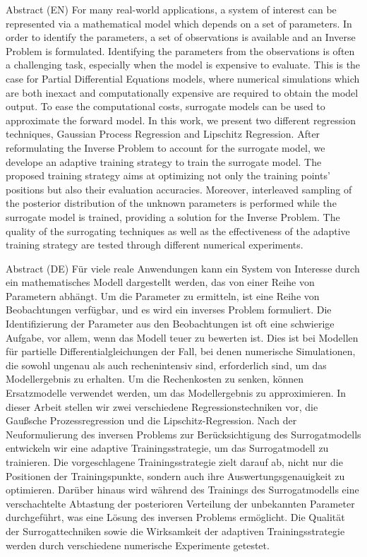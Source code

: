 \begin{abstractBox}[colbacktitle=black]{Abstract (EN)}{
    For many real-world applications, a system of interest can be represented via a mathematical model which depends on a set of parameters. 
    In order to identify the parameters, a set of observations is available and an Inverse Problem is formulated. 
    Identifying the parameters from the observations is often a challenging task, especially when the model is expensive to evaluate. 
    This is the case for Partial Differential Equations models, where numerical simulations which are both inexact and computationally expensive are required to obtain the model output. 
    To ease the computational costs, surrogate models can be used to approximate the forward model. 
    In this work, we present two different regression techniques, Gaussian Process Regression and Lipschitz Regression. 
    After reformulating the Inverse Problem to account for the surrogate model, we develope an adaptive training strategy to train the surrogate model. 
    The proposed training strategy aims at optimizing not only the training points' positions but also their evaluation accuracies.
    Moreover, interleaved sampling of the posterior distribution of the unknown parameters is performed while the surrogate model is trained, providing a solution for the Inverse Problem.
    The quality of the surrogating techniques as well as the effectiveness of the adaptive training strategy are tested through different numerical experiments.
}
\end{abstractBox}
\begin{abstractBox}[colbacktitle=black]{Abstract (DE)}{
    Für viele reale Anwendungen kann ein System von Interesse durch ein mathematisches Modell dargestellt werden, das von einer Reihe von Parametern abhängt. 
    Um die Parameter zu ermitteln, ist eine Reihe von Beobachtungen verfügbar, und es wird ein inverses Problem formuliert. 
    Die Identifizierung der Parameter aus den Beobachtungen ist oft eine schwierige Aufgabe, vor allem, wenn das Modell teuer zu bewerten ist. 
    Dies ist bei Modellen für partielle Differentialgleichungen der Fall, bei denen numerische Simulationen, die sowohl ungenau als auch rechenintensiv sind, erforderlich sind, um das Modellergebnis zu erhalten. 
    Um die Rechenkosten zu senken, können Ersatzmodelle verwendet werden, um das Modellergebnis zu approximieren. 
    In dieser Arbeit stellen wir zwei verschiedene Regressionstechniken vor, die Gaußsche Prozessregression und die Lipschitz-Regression. 
    Nach der Neuformulierung des inversen Problems zur Berücksichtigung des Surrogatmodells entwickeln wir eine adaptive Trainingsstrategie, um das Surrogatmodell zu trainieren. 
    Die vorgeschlagene Trainingsstrategie zielt darauf ab, nicht nur die Positionen der Trainingspunkte, sondern auch ihre Auswertungsgenauigkeit zu optimieren.
    Darüber hinaus wird während des Trainings des Surrogatmodells eine verschachtelte Abtastung der posterioren Verteilung der unbekannten Parameter durchgeführt, was eine Lösung des inversen Problems ermöglicht.
    Die Qualität der Surrogattechniken sowie die Wirksamkeit der adaptiven Trainingsstrategie werden durch verschiedene numerische Experimente getestet.
    }
    \end{abstractBox}
\vspace{.5cm}